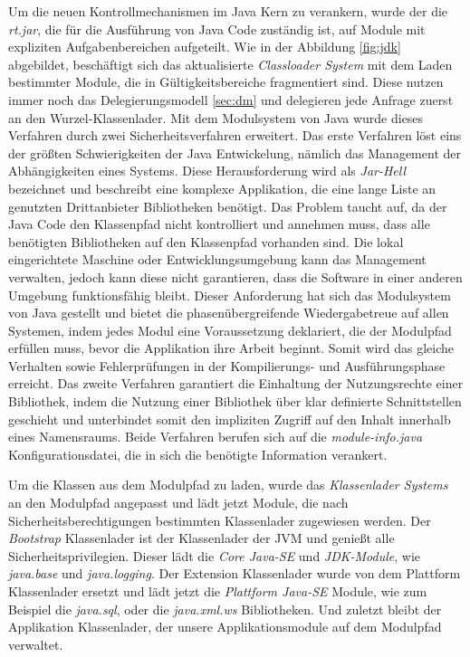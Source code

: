     Um die neuen Kontrollmechanismen im Java Kern zu verankern, wurde der die \textit{rt.jar}, die für die Ausführung von Java Code zuständig ist, auf Module mit expliziten Aufgabenbereichen aufgeteilt. Wie in der Abbildung \ref{fig:jdk} abgebildet, beschäftigt sich das aktualisierte \textit{Classloader System} mit dem Laden bestimmter Module, die in Gültigkeitsbereiche fragmentiert sind. Diese nutzen immer noch das Delegierungsmodell \ref{sec:dm} und delegieren jede Anfrage zuerst an den Wurzel-Klassenlader. Mit dem Modulsystem von Java wurde dieses Verfahren durch zwei Sicherheitsverfahren erweitert. Das erste Verfahren löst eins der größten Schwierigkeiten der Java Entwickelung, nämlich das Management der Abhängigkeiten eines Systems. Diese Herausforderung wird als \textit{Jar-Hell} bezeichnet und beschreibt eine komplexe Applikation, die eine lange Liste an genutzten Drittanbieter Bibliotheken benötigt. Das Problem taucht auf, da der Java Code den Klassenpfad nicht kontrolliert und annehmen muss, dass alle benötigten Bibliotheken auf den Klassenpfad vorhanden sind. Die lokal eingerichtete Maschine oder Entwicklungsumgebung kann das Management verwalten, jedoch kann diese nicht garantieren, dass die Software in einer anderen Umgebung funktionsfähig bleibt.\newline
    Dieser Anforderung hat sich das Modulsystem von Java gestellt und bietet die phasenübergreifende Wiedergabetreue auf allen Systemen, indem jedes Modul eine Voraussetzung deklariert, die der Modulpfad erfüllen muss, bevor die Applikation ihre Arbeit beginnt. Somit wird das gleiche Verhalten sowie Fehlerprüfungen in der Kompilierungs- und Ausführungsphase erreicht.\newline
    Das zweite Verfahren garantiert die Einhaltung der Nutzungsrechte einer Bibliothek, indem die Nutzung einer Bibliothek über klar definierte Schnittstellen geschieht und unterbindet somit den impliziten Zugriff auf den Inhalt innerhalb eines Namensraums. Beide Verfahren berufen sich auf die \textit{module-info.java} Konfigurationsdatei, die in sich die benötigte Information verankert. \bigbreak

    Um die Klassen aus dem Modulpfad zu laden, wurde das \textit{Klassenlader Systems} an den Modulpfad angepasst und lädt jetzt Module, die nach Sicherheitsberechtigungen bestimmten Klassenlader zugewiesen werden. Der \textit{Bootstrap} Klassenlader ist der Klassenlader der JVM und genießt alle Sicherheitsprivilegien. Dieser lädt die \textit{Core Java-SE} und \textit{JDK-Module}, wie \textit{java.base} und \textit{java.logging}. Der Extension Klassenlader wurde von dem Plattform Klassenlader ersetzt und lädt jetzt die \textit{Plattform Java-SE} Module, wie zum Beispiel die \textit{java.sql}, oder die \textit{java.xml.ws} Bibliotheken. Und zuletzt bleibt der Applikation Klassenlader, der unsere Applikationsmodule auf dem Modulpfad verwaltet. \cite{classLoadingOracle,modulMitJava9,java9modRevealed}

